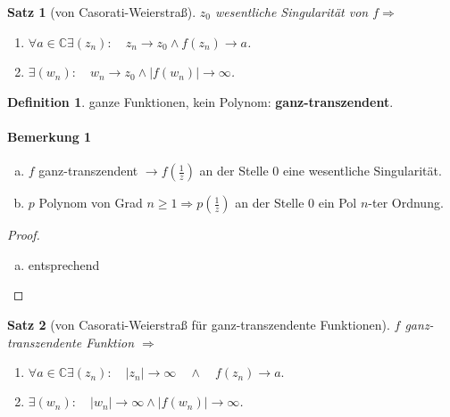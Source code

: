 \documentclass[ngerman,halfparskip]{scrartcl}
\newtheorem*{satz*}{Satz}
\theoremstyle{definition}
\newtheorem{defin}{Definition}[section]
\def\C{\mathbb C}
\begin{document}
\begin{satz*}[von Casorati-Weierstraß]
$z_0$ wesentliche Singularität von $f \Rightarrow$
\begin{enumerate}
\item $\forall a\in\C \exists (z_n): \quad z_n\rightarrow z_0 \land f(z_n)\rightarrow a$.
\item $\exists (w_n): \quad w_n\rightarrow z_0 \land |f(w_n)|\rightarrow\infty$.
\end{enumerate}
\end{satz*}

\begin{defin}
ganze Funktionen, kein Polynom: \textbf{ganz-transzendent}.
\end{defin}

\paragraph{Bemerkung 1} \begin{enumerate}[a)]
\item $f$ ganz-transzendent $\rightarrow f(\frac 1z)$ an der Stelle $0$ eine wesentliche Singularität.
\item $p$ Polynom von Grad $n\geq 1 \Rightarrow p(\frac 1z)$ an der Stelle $0$ ein Pol $n$-ter Ordnung.
\end{enumerate}
\begin{proof}
\begin{enumerate}[a)]
$f(z)=\sum\limits_{n=0}^\infty a_nz^n, \quad z\in\C$ (nicht $a_n=0$ für $n\geq n_0$) ($\Rightarrow f$ nicht beschränkt, Satz von Lionville)

$\Rightarrow f(\frac 1z)=\sum\limits_{n=0}^\infty a_n\frac 1{z^n}=\sum\limits_{n=-\infty}^0 \underbrace{a_{-n}}_{b_n}\frac 1{z^n},\quad z\neq 0$.

Es ist nicht $b_n=0$ für $n\leq n_1$, somit $0$ keine Polstelle

\item entsprechend
\end{enumerate}
\end{proof}

 \begin{satz*}[von Casorati-Weierstraß für ganz-transzendente Funktionen]
 $f$ ganz-transzendente Funktion $\Rightarrow$
 \begin{enumerate}
\item $\forall a\in\C\exists (z_n):\quad |z_n|\rightarrow \infty \quad \land \quad f(z_n)\rightarrow a.$
\item $\exists (w_n):\quad |w_n|\rightarrow \infty \land |f(w_n)|\rightarrow \infty$.
\end{enumerate}
\end{satz*}
\end{document}
